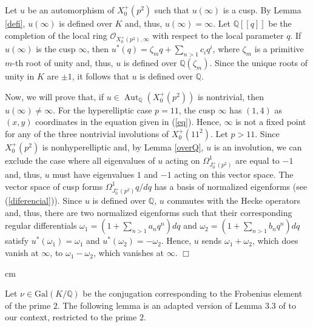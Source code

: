 \documentclass[a4paper,12pt]{article}
\theoremstyle{definition}
\theoremstyle{remark}
\numberwithin{equation}{section}
\newcommand{\Q}{\mathbb{Q}}
\newcommand{\Gal}{\mathrm{Gal}}
\newcommand{\Aut}{\operatorname{Aut}}
\newcommand{\cO}{{\mathcal O}}
\begin{document}
Let $u$ be  an  automorphism of $X_0^+(p^2)$ such that $u(\infty)$ is a cusp.   By Lemma \ref{defi},   $u(\infty)$ is defined over $K$ and, thus, $u(\infty)=\infty$.
Let $\Q [[q]]$ be the completion of the local ring $\cO_{X_0^+(p^2),\infty}$ with respect to the local parameter $q$. If $u(\infty)$ is the cusp  $\infty$, then
$u^*(q)=\zeta_m q+\sum_{n>1} c_i q^i$, where $\zeta_m$ is a primitive $m$-th root of unity and, thus,  $u$ is defined over $\Q (\zeta_m)$. Since the unique roots of  unity in $K$ are $\pm 1$, it follows that $u$ is defined over $\Q$.

Now,  we will prove that, if $u\in\Aut_\Q(X_0^+(p^2))$ is nontrivial, then $u(\infty)\neq \infty$.  For the hyperelliptic case $p=11$, the cusp $\infty$ has $(1,4)$ as $(x,y)$ coordinates in the equation given in (\ref{eq}). Hence, $\infty$ is not a fixed point for any of the three nontrivial involutions  of $X_{0}^+(11^2)$. Let  $p>11$. Since  $X_0^+(p^2)$ is nonhyperelliptic and, by Lemma \ref{overQ}, $u$ is an involution, we can exclude the case where all eigenvalues of $u$ acting on $\Omega^1_{J_0^+(p^2)}$ are equal to $-1$ and, thus,   $u$ must have eigenvalues $1$ and $-1$ acting on this vector space.
The vector space of cusp forms $\Omega^1_{J_0^+(p^2)} {q}/{dq}$ has a basis of normalized eigenforms (see (\ref{diferencial})). Since $u$ is defined over $\Q$, $u$ commutes with the Hecke operators and, thus, there are two normalized eigenforms such that their corresponding regular differentials $\omega_1=(1+\sum_{n>1} a_n q^n)dq$  and $\omega_2=(1+\sum_{n>1} b_n q^n)dq$ satisfy $u^*(\omega_1)=\omega_1$ and $u^*(\omega_2)=-\omega_2$. Hence, $u$ sends $\omega_1+\omega_2$, which does vanish at $\infty$, to $\omega_1-\omega_2$, which vanishes at $\infty$.
\hfill $\Box$





 cm


Let $\nu\in\Gal (K/\Q)$ be the conjugation corresponding to the Frobenius element of the prime $2$.
The following lemma is an adapted version of Lemma 3.3 of \cite{BH} to our context, restricted to the prime $2$.
\end{document}
